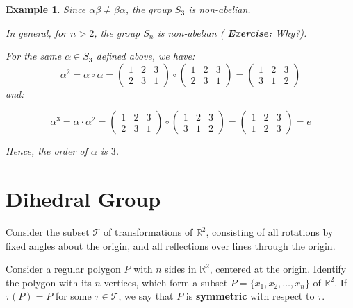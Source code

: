 \documentclass[a4paper,12pt]{report}
\newcounter{statement}
\numberwithin{statement}{chapter}
\newtheorem{eg}[statement]{\bf Example}
\numberwithin{equation}{chapter}
\numberwithin{section}{chapter}
\numberwithin{subsection}{section}
\begin{document}
\begin{eg}
Since $\alpha\beta \neq \beta\alpha$, the group $S_3$ is non-abelian.




In general, for $n > 2$, the group $S_n$ is non-abelian ( {\bf Exercise:}  Why?).




For the same $\alpha \in S_3$ defined above, we have:
\[
\alpha^2 = \alpha\circ\alpha =
\left(\begin{matrix}
1 & 2 & 3\\
2 & 3 & 1
\end{matrix}\right)\circ
\left(\begin{matrix}
1 & 2 & 3\\
2 & 3 & 1
\end{matrix}\right) =
\left(\begin{matrix}
1 & 2 & 3\\
3 & 1 & 2
\end{matrix}\right)
\]
and:




\[
\alpha^3 = \alpha\cdot\alpha^2
= \left(\begin{matrix}
1 & 2 & 3\\
2 & 3 & 1
\end{matrix}\right)
\circ
\left(\begin{matrix}
1 & 2 & 3\\
3 & 1 & 2
\end{matrix}\right)
=
\left(\begin{matrix}
1 & 2 & 3\\
1 & 2 & 3
\end{matrix}\right) = e
\]

Hence, the order of $\alpha$ is $3$.

\end{eg}

\section{Dihedral Group}

Consider the subset $\mathcal{T}$ of transformations of $\mathbb{R}^2$,
consisting of all rotations by fixed angles about the origin, and all reflections over lines through the origin.




Consider a regular polygon $P$ with $n$ sides in $\mathbb{R}^2$, centered at the origin.
Identify the polygon with its $n$ vertices, which form a subset $P = \{x_1, x_2, \ldots, x_n\}$
of $\mathbb{R}^2$.  If $\tau(P) = P$ for some $\tau \in \mathcal{T}$, we say that $P$ is  {\bf symmetric} 
with respect to $\tau$.
\end{document}
